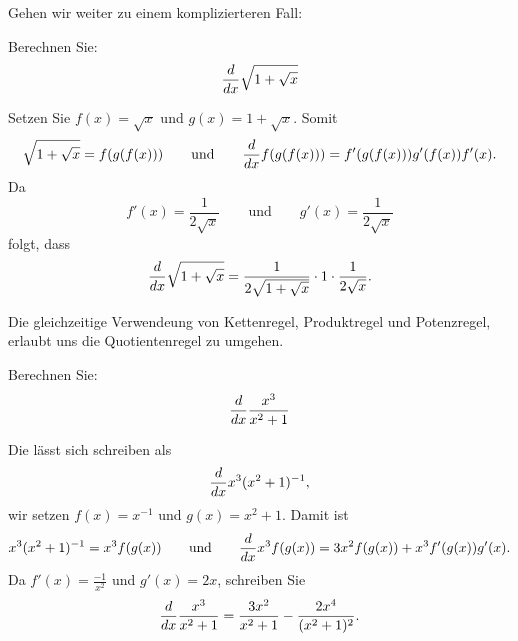Gehen wir weiter zu einem komplizierteren Fall:

\begin{example}
Berechnen Sie:
\[
\frac{d}{dx} \sqrt{1+\sqrt{x}}
\]
\end{example}

\begin{solution}
Setzen Sie 
$f(x)=\sqrt{x}$ und $g(x)=1+\sqrt{x}$. Somit
\[
\sqrt{1+\sqrt{x}}=f(g(f(x))) \qquad\text{und}\qquad\frac{d}{dx} f(g(f(x))) = f'(g(f(x)))g'(f(x))f'(x).
\]
Da 
\[
f'(x) = \frac{1}{2\sqrt{x}} \qquad\text{und}\qquad g'(x) = \frac{1}{2\sqrt{x}}
\]
folgt, dass
\[
\frac{d}{dx} \sqrt{1+\sqrt{x}} = \frac{1}{2\sqrt{1+\sqrt{x}}}\cdot 1\cdot  \frac{1}{2\sqrt{x}}.
\]
\end{solution}

Die gleichzeitige Verwendeung von Kettenregel, Produktregel und Potenzregel, erlaubt uns die Quotientenregel zu umgehen.


\begin{example}
Berechnen Sie:
\[
\frac{d}{dx} \frac{x^3}{x^2+1}
\]
\end{example}
\begin{solution}
Die lässt sich schreiben als 
\[
\frac{d}{dx} x^3(x^2+1)^{-1}, 
\]
wir setzen $f(x) = x^{-1}$ und $g(x) = x^2+1$. Damit ist
\[
x^3(x^2+1)^{-1} = x^3 f(g(x)) \qquad\text{und}\qquad \frac{d}{dx} x^3 f(g(x)) = 3x^2f(g(x))+ x^3 f'(g(x))g'(x).
\]
Da $f'(x) = \frac{-1}{x^2}$ und $g'(x) = 2x$, schreiben Sie
\[
\frac{d}{dx} \frac{x^3}{x^2+1} = \frac{3x^2}{x^2+1}-\frac{2x^4}{(x^2+1)^2}.
\]
\end{solution}


